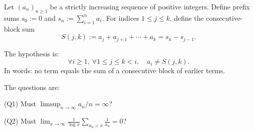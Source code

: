 Let $(a_n)_{n\ge 1}$ be a strictly increasing sequence of positive integers.
Define prefix sums $s_0:=0$ and $s_n:=\sum_{i=1}^n a_i$.
For indices $1\le j\le k$, define the consecutive-block sum
\[
S(j,k):=a_j+a_{j+1}+\cdots+a_k = s_k-s_{j-1}.
\]

The hypothesis is:
\[
\forall i\ge 1,\ \forall 1\le j\le k < i,\quad a_i \neq S(j,k).
\]
In words: no term equals the sum of a consecutive block of earlier terms.

The questions are:

(Q1) Must $\limsup_{n\to\infty} a_n/n = \infty$?

(Q2) Must $\lim_{x\to\infty} \frac{1}{\log x}\sum_{a_n<x}\frac{1}{a_n}=0$?
